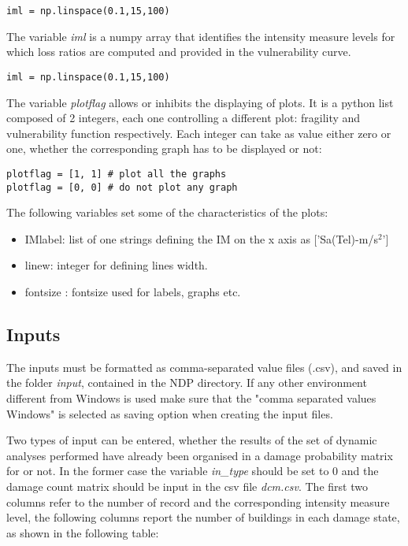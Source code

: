 \begin{Verbatim}[frame=single, commandchars=\\\{\}, samepage=true]
iml = np.linspace(0.1,15,100)
\end{Verbatim}

The variable \textit{iml} is a numpy array that identifies the intensity measure levels for which loss ratios are computed and provided in the vulnerability curve.

\begin{Verbatim}[frame=single, commandchars=\\\{\}, samepage=true]
iml = np.linspace(0.1,15,100)
\end{Verbatim}

The variable \textit{plotflag} allows or inhibits the displaying of plots. It is a python list composed of 2 integers, each one controlling a different plot: fragility and vulnerability function respectively. Each integer can take as value either zero or one, whether the corresponding graph has to be displayed or not:

\begin{Verbatim}[frame=single, commandchars=\\\{\}, samepage=true]
plotflag = [1, 1] # plot all the graphs
plotflag = [0, 0] # do not plot any graph
\end{Verbatim}

The following variables set some of the characteristics of the plots:
\begin{itemize}
\item IMlabel: list of one strings defining the IM on the x axis as ['Sa(Tel)-m/s$^{2}$']
\item linew: integer for defining lines width.
\item fontsize : fontsize used for labels, graphs etc.
\end{itemize}

\subsection{Inputs}
\label{subsec:NDMinputs}
The inputs must be formatted as comma-separated value files (.csv), and saved in the folder \textit{input}, contained in the NDP directory. If any other environment different from Windows is used make sure that the "comma separated values Windows" is selected as saving option when creating the input files.  

Two types of input can be entered, whether the results of the set of dynamic analyses performed have already been organised in a damage probability matrix for or not. In the former case the variable \textit{in\_type} should be set to 0 and the damage count matrix should be input in the csv file \textit{dcm.csv}. The first two columns refer to the number of record and the corresponding intensity measure level, the following columns report the number of buildings in each damage state, as shown in the following table:

